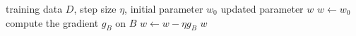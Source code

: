 \REQUIRE training data $D$, step size $\eta$, initial parameter $w_0$
\ENSURE updated parameter $w$
\STATE $w \gets w_0$
  \STATE compute the gradient $g_B$ on $B$
  \STATE $w \gets w - \eta g_B$
\ENDFOR
\RETURN $w$
